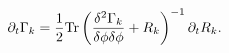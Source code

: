 \begin{equation}
\label{eq:ERGE}
\partial_t\Gamma_k=
{1\over2}\mathrm{Tr}\left({\delta^2\Gamma_k\over\delta\phi\delta\phi}+R_k\right)^{-1}
\partial_tR_k.
\end{equation}

